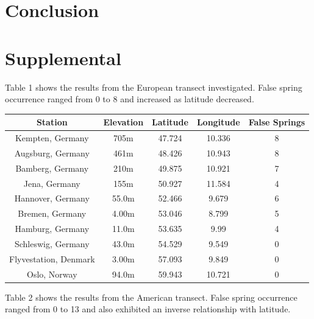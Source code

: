 \documentclass{article}\usepackage[]{graphicx}\usepackage[]{color}
\begin{document}
\section*{Conclusion}

\section*{Supplemental}
Table 1 shows the results from the European transect investigated. False spring occurrence ranged from 0 to 8 and increased as latitude decreased. 

\begin{center}
 \label{tab:title} 
\begin{tabular}{c c c c c}
\hline
Station & Elevation & Latitude & Longitude & False Springs \\
\hline
Kempten, Germany & 705m & 47.724 & 10.336 & 8 \\
Augsburg, Germany & 461m & 48.426 & 10.943 & 8 \\
Bamberg, Germany & 210m & 49.875 & 10.921 & 7 \\
Jena, Germany & 155m & 50.927 & 11.584 & 4 \\
Hannover, Germany & 55.0m & 52.466 & 9.679 & 6 \\
Bremen, Germany & 4.00m & 53.046 & 8.799 & 5 \\
Hamburg, Germany & 11.0m & 53.635 & 9.99 & 4 \\
Schleswig, Germany & 43.0m & 54.529 & 9.549 & 0 \\
Flyvestation, Denmark & 3.00m & 57.093 & 9.849 & 0 \\
Oslo, Norway & 94.0m & 59.943 & 10.721 & 0 \\
\hline
\end{tabular}
\end{center}

Table 2 shows the results from the American transect. False spring occurrence ranged from 0 to 13 and also exhibited an inverse relationship with latitude. 
\end{document}

